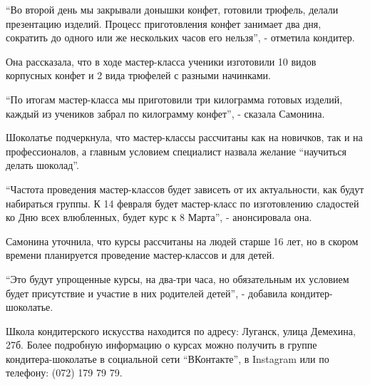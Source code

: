 \enquote{Во второй день мы закрывали донышки конфет, готовили трюфель, делали
презентацию изделий. Процесс приготовления конфет занимает два дня, сократить
до одного или же нескольких часов его нельзя}, - отметила кондитер.

Она рассказала, что в ходе мастер-класса ученики изготовили 10 видов корпусных
конфет и 2 вида трюфелей с разными начинками.

\enquote{По итогам мастер-класса мы приготовили три килограмма готовых изделий, каждый
из учеников забрал по килограмму конфет}, - сказала Самонина.

Шоколатье подчеркнула, что мастер-классы рассчитаны как на новичков, так и на
профессионалов, а главным условием специалист назвала желание \enquote{научиться делать
шоколад}.

\enquote{Частота проведения мастер-классов будет зависеть от их актуальности, как будут
набираться группы. К 14 февраля будет мастер-класс по изготовлению сладостей ко
Дню всех влюбленных, будет курс к 8 Марта}, - анонсировала она.

Самонина уточнила, что курсы рассчитаны на людей старше 16 лет, но в скором
времени планируется проведение мастер-классов и для детей.

\enquote{Это будут упрощенные курсы, на два-три часа, но обязательным их условием будет
присутствие и участие в них родителей детей}, - добавила кондитер-шоколатье.

Школа кондитерского искусства находится по адресу: Луганск, улица Демехина,
27б. Более подробную информацию о курсах можно получить в группе
кондитера-шоколатье в социальной сети \enquote{ВКонтакте}, в Instagram или по телефону:
(072) 179 79 79. 
